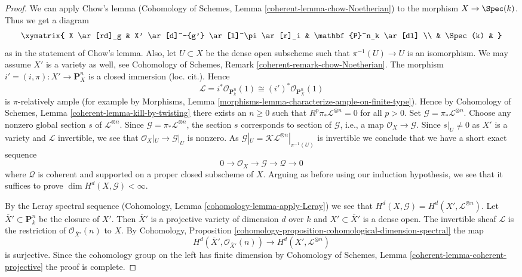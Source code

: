 \begin{proof}
\medskip\noindent
We can apply Chow's lemma
(Cohomology of Schemes, Lemma \ref{coherent-lemma-chow-Noetherian})
to the morphism $X \to \Spec(k)$. Thus we get a diagram
$$
\xymatrix{
X \ar[rd]_g & X' \ar[d]^-{g'} \ar[l]^\pi \ar[r]_i & \mathbf{P}^n_k \ar[dl] \\
& \Spec(k) &
}
$$
as in the statement of Chow's lemma. Also, let $U \subset X$ be
the dense open subscheme such that $\pi^{-1}(U) \to U$ is an isomorphism.
We may assume $X'$ is a variety as well, see
Cohomology of Schemes, Remark \ref{coherent-remark-chow-Noetherian}.
The morphism $i' = (i, \pi) : X' \to \mathbf{P}^n_X$ is
a closed immersion (loc. cit.). Hence
$$
\mathcal{L} = i^*\mathcal{O}_{\mathbf{P}^n_k}(1) \cong
(i')^*\mathcal{O}_{\mathbf{P}^n_X}(1)
$$
is $\pi$-relatively ample (for example by
Morphisms, Lemma \ref{morphisms-lemma-characterize-ample-on-finite-type}).
Hence by Cohomology of Schemes, Lemma \ref{coherent-lemma-kill-by-twisting}
there exists an $n \geq 0$ such that
$R^p\pi_*\mathcal{L}^{\otimes n} = 0$ for all $p > 0$.
Set $\mathcal{G} = \pi_*\mathcal{L}^{\otimes n}$.
Choose any nonzero global section $s$ of $\mathcal{L}^{\otimes n}$.
Since $\mathcal{G} = \pi_*\mathcal{L}^{\otimes n}$, the section $s$
corresponds to section of $\mathcal{G}$, i.e., a map
$\mathcal{O}_X \to \mathcal{G}$.
Since $s|_U \not = 0$ as $X'$ is a variety and $\mathcal{L}$
invertible, we see that $\mathcal{O}_X|_U \to \mathcal{G}|_U$
is nonzero. As $\mathcal{G}|_U = \mathcal{KL}^{\otimes n}|_{\pi^{-1}(U)}$
is invertible we conclude that we have a short exact sequence
$$
0 \to \mathcal{O}_X \to \mathcal{G} \to \mathcal{Q} \to 0
$$
where $\mathcal{Q}$ is coherent and supported on a proper
closed subscheme of $X$. Arguing as before using our induction
hypothesis, we see that it
suffices to prove $\dim H^d(X, \mathcal{G}) < \infty$.

\medskip\noindent
By the Leray spectral sequence
(Cohomology, Lemma \ref{cohomology-lemma-apply-Leray})
we see that $H^d(X, \mathcal{G}) = H^d(X', \mathcal{L}^{\otimes n})$.
Let $\overline{X}' \subset \mathbf{P}^n_k$ be the closure
of $X'$. Then $\overline{X}'$ is a projective variety of dimension $d$
over $k$ and $X' \subset \overline{X}'$ is a dense open.
The invertible sheaf $\mathcal{L}$ is the restriction of
$\mathcal{O}_{\overline{X}'}(n)$ to $X$. By
Cohomology, Proposition
\ref{cohomology-proposition-cohomological-dimension-spectral}
the map
$$
H^d(\overline{X}', \mathcal{O}_{\overline{X}'}(n))
\longrightarrow
H^d(X', \mathcal{L}^{\otimes n})
$$
is surjective. Since the cohomology group on the left has
finite dimension by
Cohomology of Schemes, Lemma \ref{coherent-lemma-coherent-projective}
the proof is complete.
\end{proof}

